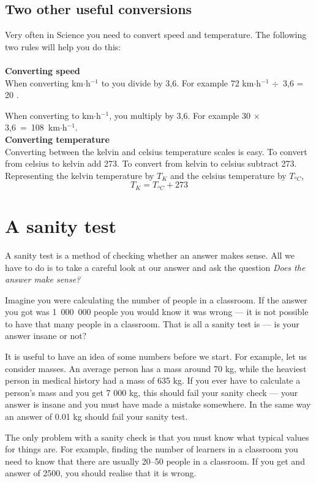 \subsection{Two other useful conversions}
Very often in Science you need to convert speed and temperature. The following two rules will help you do this:\\
\\
{\bf{Converting speed}}\\
When converting km$\cdot$h$^{-1}$ to \ms you divide by 3,6. For example 72 km$\cdot$h$^{-1}$ $\div$~3,6 = 20 \ms.

When converting \ms to km$\cdot$h$^{-1}$, you multiply by 3,6. For example 30 \ms $\times$3,6~=~108~km$\cdot$h$^{-1}$.\\

{\bf{Converting temperature}}\\
Converting between the kelvin and celsius temperature scales is easy. To convert from celsius to kelvin add 273. To convert from kelvin to celsius subtract 273. Representing the kelvin temperature by $T_{K}$ and the celsius temperature by $T_{^oC}$,
\begin{equation*}
T_K = T_{^oC} + 273
\end{equation*}

\section{A sanity test}
A sanity test is a method of checking whether an answer makes sense. All we have to do is to take a careful look at our answer and ask the question \textit{Does the answer make sense?}

Imagine you were calculating the number of people in a classroom. If the answer you got was 1~000~000 people you would know it was wrong --- it is not possible to have that many people in a classroom. That is all a sanity test is --- is your answer insane or not? 

It is useful to have an idea of some numbers before we start. For example, let us consider masses. An average person has a mass around 70 kg, while the heaviest person in medical history had a mass of 635 kg. If you ever have to calculate a person's mass and you get 7 000 kg, this should fail your sanity check --- your answer is insane and you must have made a mistake somewhere. In the same way an answer of 0.01 kg should fail your sanity test.

The only problem with a sanity check is that you must know what typical values for things are. For example, finding the number of learners in a classroom you need to know that there are usually 20--50 people in a classroom. If you get and answer of 2500, you should realise that it is wrong. 

